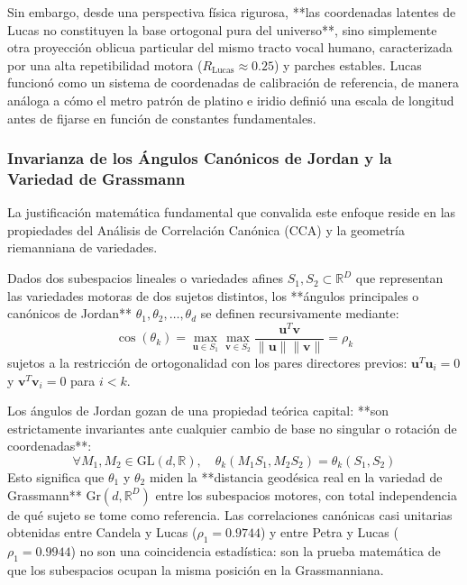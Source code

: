 \documentclass[11pt,a4paper,openany]{book}
\theoremstyle{definition}
\begin{document}
Sin embargo, desde una perspectiva física rigurosa, **las coordenadas latentes de Lucas no constituyen la base ortogonal pura del universo**, sino simplemente otra proyección oblicua particular del mismo tracto vocal humano, caracterizada por una alta repetibilidad motora ($R_{\text{Lucas}} \approx 0.25$) y parches estables. Lucas funcionó como un sistema de coordenadas de calibración de referencia, de manera análoga a cómo el metro patrón de platino e iridio definió una escala de longitud antes de fijarse en función de constantes fundamentales.

\subsubsection{Invarianza de los Ángulos Canónicos de Jordan y la Variedad de Grassmann}
\label{subsubsec:invarianza_jordan_grassmann}

La justificación matemática fundamental que convalida este enfoque reside en las propiedades del Análisis de Correlación Canónica (CCA) y la geometría riemanniana de variedades. 

Dados dos subespacios lineales o variedades afines $S_1, S_2 \subset \mathbb{R}^D$ que representan las variedades motoras de dos sujetos distintos, los **ángulos principales o canónicos de Jordan** $\theta_1, \theta_2, \dots, \theta_d$ se definen recursivamente mediante:
\begin{equation}
\cos(\theta_k) = \max_{\mathbf{u} \in S_1} \max_{\mathbf{v} \in S_2} \frac{\mathbf{u}^T \mathbf{v}}{\|\mathbf{u}\| \|\mathbf{v}\|} = \rho_k
\end{equation}
sujetos a la restricción de ortogonalidad con los pares directores previos: $\mathbf{u}^T \mathbf{u}_i = 0$ y $\mathbf{v}^T \mathbf{v}_i = 0$ para $i < k$.

Los ángulos de Jordan gozan de una propiedad teórica capital: **son estrictamente invariantes ante cualquier cambio de base no singular o rotación de coordenadas**:
\begin{equation}
\forall M_1, M_2 \in \text{GL}(d, \mathbb{R}), \quad \theta_k(M_1 S_1, M_2 S_2) = \theta_k(S_1, S_2)
\end{equation}
Esto significa que $\theta_1$ y $\theta_2$ miden la **distancia geodésica real en la variedad de Grassmann** $\text{Gr}(d, \mathbb{R}^D)$ entre los subespacios motores, con total independencia de qué sujeto se tome como referencia. Las correlaciones canónicas casi unitarias obtenidas entre Candela y Lucas ($\rho_1 = 0.9744$) y entre Petra y Lucas ($\rho_1 = 0.9944$) no son una coincidencia estadística: son la prueba matemática de que los subespacios ocupan la misma posición en la Grassmanniana.
\end{document}
